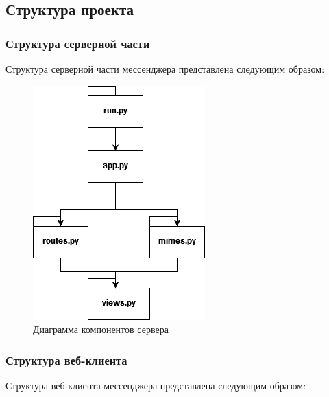 \subsection{Структура проекта}
\subsubsection{Структура серверной части}
Структура серверной части мессенджера представлена следующим образом:

\begin{figure}[H]
	\centering
	\includegraphics[width=0.7\linewidth]{images/Server_diag}
	\caption{Диаграмма компонентов сервера}
	\label{fig:serverdiag}
\end{figure}

\subsubsection{Структура веб-клиента}
Структура веб-клиента мессенджера представлена следующим образом:

